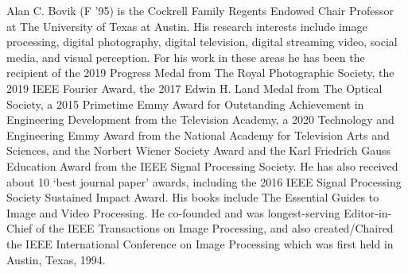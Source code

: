 \documentclass[journal]{IEEEtran}
\begin{document}
\begin{IEEEbiography}{Alan C. Bovik} (F ’95) is the Cockrell Family Regents Endowed Chair Professor at The University of Texas at Austin. His research interests include image processing, digital photography, digital television, digital streaming video, social media, and visual perception. For his work in these areas he has been the recipient of the 2019 Progress Medal from The Royal Photographic Society, the 2019 IEEE Fourier Award, the 2017 Edwin H. Land Medal from The Optical Society, a 2015 Primetime Emmy Award for Outstanding Achievement in Engineering Development from the Television Academy, a 2020 Technology and Engineering Emmy Award from the National Academy for Television Arts and Sciences, and the Norbert Wiener Society Award and the Karl Friedrich Gauss Education Award from the IEEE Signal Processing Society. He has also received about 10 ‘best journal paper’ awards, including the 2016 IEEE Signal Processing Society Sustained Impact Award. His books include The Essential Guides to Image and Video Processing. He co-founded and was longest-serving Editor-in-Chief of the IEEE Transactions on Image Processing, and also created/Chaired the IEEE International Conference on Image Processing which was first held in Austin, Texas, 1994.
\end{IEEEbiography}
\end{document}
